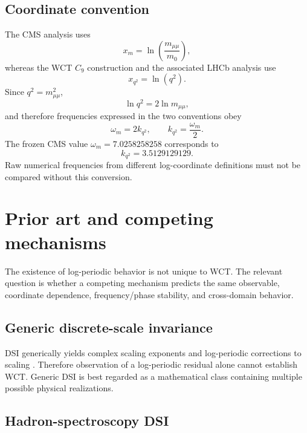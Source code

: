 \documentclass[11pt]{article}
\begin{document}
\subsection{Coordinate convention}

The CMS analysis uses
\begin{equation}
x_m=\ln\!\left(\frac{m_{\mu\mu}}{m_0}\right),
\end{equation}
whereas the WCT \(C_9\) construction and the associated LHCb analysis use
\begin{equation}
x_{q^2}=\ln(q^2).
\end{equation}
Since \(q^2=m_{\mu\mu}^2\),
\begin{equation}
\ln q^2 = 2\ln m_{\mu\mu},
\end{equation}
and therefore frequencies expressed in the two conventions obey
\begin{equation}
\boxed{
\omega_m=2k_{q^2},
\qquad
k_{q^2}=\frac{\omega_m}{2}.
}
\label{eq:freqconvert}
\end{equation}
The frozen CMS value
\(\omega_m=7.0258258258\) corresponds to
\begin{equation}
k_{q^2}=3.5129129129.
\end{equation}
Raw numerical frequencies from different log-coordinate definitions must not
be compared without this conversion.

\section{Prior art and competing mechanisms}

The existence of log-periodic behavior is not unique to WCT.  The relevant
question is whether a competing mechanism predicts the same observable,
coordinate dependence, frequency/phase stability, and cross-domain behavior.

\subsection{Generic discrete-scale invariance}

DSI generically yields complex scaling exponents and log-periodic corrections
to scaling \cite{Sornette1998}.  Therefore observation of a log-periodic
residual alone cannot establish WCT.  Generic DSI is best regarded as a
mathematical class containing multiple possible physical realizations.

\subsection{Hadron-spectroscopy DSI}
\end{document}
